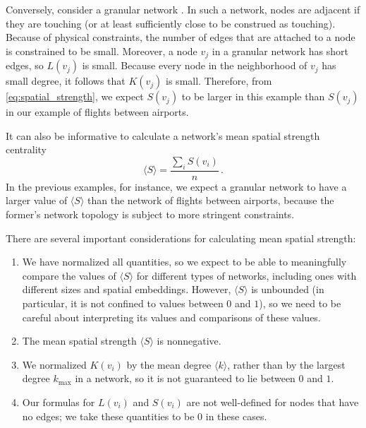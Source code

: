 \documentclass[%
 reprint,
 amsmath,amssymb,
 aps,
]{revtex4-1}
\begin{document}


Conversely, consider a granular network \cite{papa2018}. In such a network, nodes are adjacent if they are touching (or at least sufficiently close to be construed as touching). Because of physical constraints, the number of edges that are attached to a node is constrained to be small.
Moreover, a node $v_j$ in a granular network has short edges, so $L(v_j)$ is small. Because every node in the neighborhood of $v_j$ has small degree, it follows that $K(v_j)$ is small. Therefore, from \eqref{eq:spatial_strength}, we expect $S(v_j)$ to be larger in this example than $S(v_j)$ in our example of flights between airports.

It can also be informative to calculate a network's mean spatial strength centrality
\begin{equation}
    \langle S \rangle = \frac{\sum_i S(v_i)}{n}\,.
\end{equation}
In the previous examples, for instance, we expect a granular network to have a larger value of $\langle S \rangle$ than the network of flights between airports, because the former's network topology is subject to more stringent constraints.


There are several important considerations for calculating mean spatial strength:
\begin{enumerate}
    \item We have normalized all quantities, so we expect to be able to meaningfully compare the values of $\langle S \rangle$ for different types of networks, including ones with different sizes and spatial embeddings. However, $\langle S \rangle$ is unbounded (in particular, it is not confined to values between $0$ and $1$), so we need to be careful about interpreting its values and comparisons of these values.
    \item The mean spatial strength $\langle S \rangle$ is nonnegative.
    \item We normalized $K(v_i)$ by the mean degree $\langle k \rangle$, rather than by the largest degree $k_{\mathrm{max}}$ in a network, so it is not guaranteed to lie between $0$ and $1$.
    \item Our formulas for $L(v_i)$ and $S(v_i)$ are not well-defined for nodes that have no edges; we take these quantities to be $0$ in these cases.
\end{enumerate}
\end{document}
